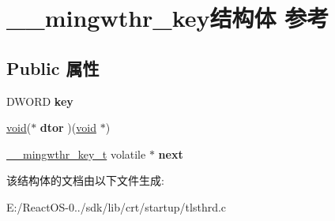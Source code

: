 \hypertarget{struct____mingwthr__key}{}\section{\+\_\+\+\_\+mingwthr\+\_\+key结构体 参考}
\label{struct____mingwthr__key}
\subsection*{Public 属性}
\begin{DoxyCompactItemize}
\item 
\mbox{\label{struct____mingwthr__key_a9f5f84a9128327c3083384491681a771}} 
D\+W\+O\+RD {\bfseries key}
\item 
\mbox{\label{struct____mingwthr__key_a7586021b45494e4ee58d8004c7ddea3f}} 
\hyperlink{interfacevoid}{void}($\ast$ {\bfseries dtor} )(\hyperlink{interfacevoid}{void} $\ast$)
\item 
\mbox{\label{struct____mingwthr__key_a87c48887fca9fd347be2285fa2e9d32a}} 
\hyperlink{struct____mingwthr__key}{\+\_\+\+\_\+mingwthr\+\_\+key\+\_\+t} volatile $\ast$ {\bfseries next}
\end{DoxyCompactItemize}


该结构体的文档由以下文件生成\+:\begin{DoxyCompactItemize}
\item 
E\+:/\+React\+O\+S-\/0../sdk/lib/crt/startup/tlsthrd.\+c\end{DoxyCompactItemize}
